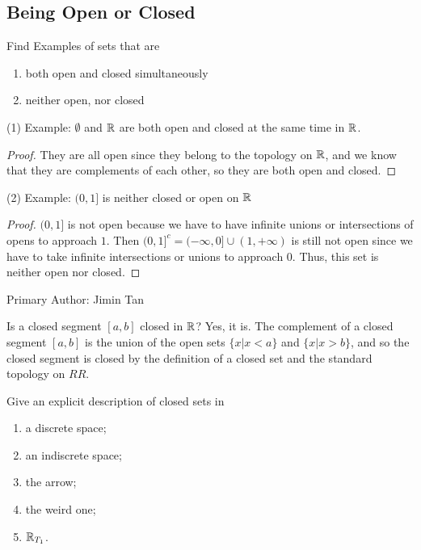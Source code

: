 \subsection{Being Open or Closed}
\begin{majorEx} %
  Find Examples of sets that are 
  \begin{enumerate}
  \item both open and closed simultaneously
  \item neither open, nor closed
  \end{enumerate}
\end{majorEx}

(1) Example: $\emptyset$ and $\mathbb{R}$ are both open and closed at the same time in $\mathbb{R}$.
\begin{proof}
They are all open since they belong to the topology on $\mathbb{R}$, and we know that they are complements of each other, so they are both open and closed.
\end{proof}

(2) Example: $(0, 1]$ is neither closed or open on $\mathbb{R}$
\begin{proof}
$(0, 1]$ is not open because we have to have infinite unions or intersections of opens to approach $1$. Then $(0, 1]^c = (-\infty, 0] \cup (1, +\infty)$ is still not open since we have to take infinite intersections or unions to approach $0$. Thus, this set is neither open nor closed.
\end{proof}

Primary Author: Jimin Tan

\begin{majorEx} %
Is a closed segment $[a, b]$ closed in $\mathbb{R}$?
Yes, it is. The complement of a closed segment $[a, b]$ is the union of the open sets $\{x | x < a\}$ and $\{x | x > b\}$, and so the closed segment is closed by the definition of a closed set and the standard topology on $RR$.
\end{majorEx}

\begin{minorEx}
    Give an explicit description of closed sets in
    \begin{enumerate}
        \item a discrete space;
        \item an indiscrete space;
        \item the arrow;
        \item the weird one;
        \item $\mathbb{R}_{T_1}$.
    \end{enumerate}
\end{minorEx}

